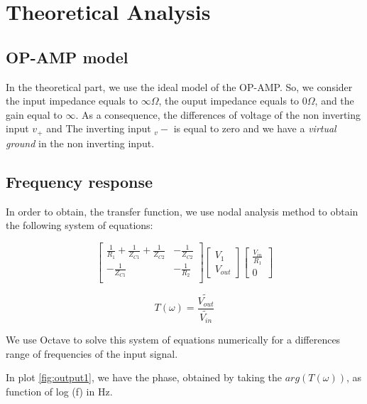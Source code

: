 \section{Theoretical Analysis}
\label{sec:analysis}

\subsection{OP-AMP model}

In the theoretical part, we use the ideal model of the OP-AMP. So, we consider the input impedance equals to $\infty \Omega$, the ouput impedance
equals to $0 \Omega$, and the gain equal to $\infty$. As a consequence, the differences of voltage of the non inverting input $v_{+}$ and The
inverting input $_v{-}$ is equal to zero and we have a \textit{virtual ground} in the non inverting input.


\subsection{Frequency response}

In order to obtain, the transfer function, we use nodal analysis method to obtain the following system of equations:

\[
  \begin{bmatrix}
    \frac{1}{R_1} + \frac{1}{Z_{C1}} + \frac{1}{Z_{C2}} & -\frac{1}{Z_{C2}} \\
    -\frac{1}{Z_{C1}}                                   & -\frac{1}{R_2}    \\
  \end{bmatrix}
  \begin{bmatrix}
    V_{1} \\ V_{out}
  \end{bmatrix}
  \begin{bmatrix}
    \frac{V_{in}}{R_1} \\ 0
  \end{bmatrix}
\]

\hfill



\begin{equation}
  T(\omega) = \frac{\widetilde{V_{out}}}{\widetilde{V_{in}}}
  \label{frequencyR}
\end{equation}

We use Octave to solve this system of equations numerically for a differences range of frequencies of the input signal.

In plot \ref{fig:output1}, we have the phase, obtained by taking the $arg(T(\omega))$, as function of log (f) in Hz.

